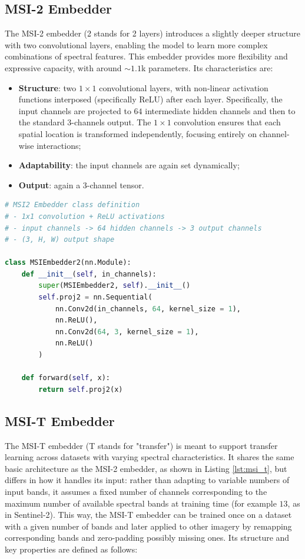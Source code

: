 \documentclass[a4paper, oneside, english]{sapthesis} %
\begin{document}
\subsection{MSI-2 Embedder}

The MSI-2 embedder (2 stands for 2 layers) introduces a slightly deeper structure with two convolutional layers, enabling the model to learn more complex combinations of spectral features. This embedder provides more flexibility and expressive capacity, with around $\sim 1.1$k parameters. Its characteristics are:

\begin{itemize}
    \item \textbf{Structure}: two $1\times1$ convolutional layers, with non-linear activation functions interposed (specifically ReLU) after each layer. Specifically, the input channels are projected to $64$ intermediate hidden channels and then to the standard 3-channels output. The $1\times1$ convolution ensures that each spatial location is transformed independently, focusing entirely on channel-wise interactions;
    \item \textbf{Adaptability}: the input channels are again set dynamically;
    \item \textbf{Output}: again a 3-channel tensor.
\end{itemize}

\vspace{-0.3cm}

\begin{lstlisting}[language=Python, caption={MSI-2 Embedder implemented in PyTorch.}, label={lst:msi2}]
# MSI2 Embedder class definition
# - 1x1 convolution + ReLU activations
# - input channels -> 64 hidden channels -> 3 output channels
# - (3, H, W) output shape

class MSIEmbedder2(nn.Module):
    def __init__(self, in_channels):
        super(MSIEmbedder2, self).__init__()
        self.proj2 = nn.Sequential(
            nn.Conv2d(in_channels, 64, kernel_size = 1),
            nn.ReLU(),
            nn.Conv2d(64, 3, kernel_size = 1),
            nn.ReLU()
        )

    def forward(self, x):
        return self.proj2(x)
\end{lstlisting}


\subsection{MSI-T Embedder}

The MSI-T embedder (T stands for "transfer") is meant to support transfer learning across datasets with varying spectral characteristics. It shares the same basic architecture as the MSI-2 embedder, as shown in Listing \ref{lst:msi_t}, but differs in how it handles its input: rather than adapting to variable numbers of input bands, it assumes a fixed number of channels corresponding to the maximum number of available spectral bands at training time (for example $13$, as in Sentinel-2). This way, the MSI-T embedder can be trained once on a dataset with a given number of bands and later applied to other imagery by remapping corresponding bands and zero-padding possibly missing ones. Its structure and key properties are defined as follows:
\end{document}

